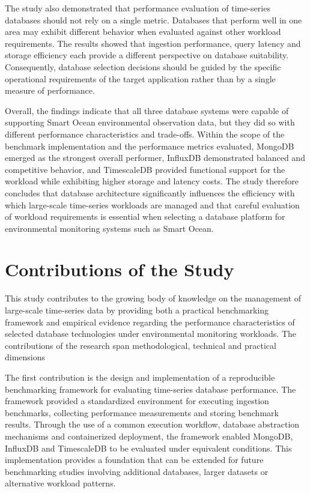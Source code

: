 The study also demonstrated that performance evaluation of time-series databases should not rely on a single metric. Databases that perform well in one area may exhibit different behavior when evaluated against other workload requirements. The results showed that ingestion performance, query latency and storage efficiency each provide a different perspective on database suitability. Consequently, database selection decisions should be guided by the specific operational requirements of the target application rather than by a single measure of performance.


Overall, the findings indicate that all three database systems were capable of supporting Smart Ocean environmental observation data, but they did so with different performance characteristics and trade-offs. Within the scope of the benchmark implementation and the performance metrics evaluated, MongoDB emerged as the strongest overall performer, InfluxDB demonstrated balanced and competitive behavior, and TimescaleDB provided functional support for the workload while exhibiting higher storage and latency costs. The study therefore concludes that database architecture significantly influences the efficiency with which large-scale time-series workloads are managed and that careful evaluation of workload requirements is essential when selecting a database platform for environmental monitoring systems such as Smart Ocean.


\section{Contributions of the Study}
This study contributes to the growing body of knowledge on the management of large-scale time-series data by providing both a practical benchmarking framework and empirical evidence regarding the performance characteristics of selected database technologies under environmental monitoring workloads. The contributions of the research span methodological, technical and practical dimensions



The first contribution is the design and implementation of a reproducible benchmarking framework for evaluating time-series database performance. The framework provided a standardized environment for executing ingestion benchmarks, collecting performance measurements and storing benchmark results. Through the use of a common execution workflow, database abstraction mechanisms and containerized deployment, the framework enabled MongoDB, InfluxDB and TimescaleDB to be evaluated under equivalent conditions. This implementation provides a foundation that can be extended for future benchmarking studies involving additional databases, larger datasets or alternative workload patterns.



